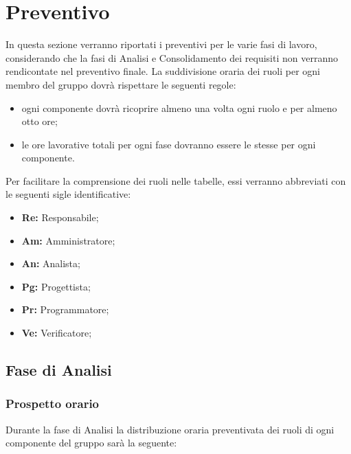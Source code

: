 \section{Preventivo}
	In questa sezione verranno riportati i preventivi per le varie fasi di lavoro, considerando che la fasi di Analisi e Consolidamento dei requisiti non verranno rendicontate nel preventivo finale. 
	La suddivisione oraria dei ruoli per ogni membro del gruppo dovrà rispettare le seguenti regole:
		\begin{itemize}
		\item ogni componente dovrà ricoprire almeno una volta ogni ruolo e per almeno otto ore;
		\item le ore lavorative totali per ogni fase dovranno essere le stesse per ogni componente.
	\end{itemize}
	 Per facilitare la comprensione dei ruoli nelle tabelle, essi verranno abbreviati con le seguenti sigle identificative:
			\begin{itemize}
			\item\textbf{Re:} Responsabile;
			\item\textbf{Am:} Amministratore;
			\item\textbf{An:} Analista;
			\item\textbf{Pg:} Progettista;
			\item\textbf{Pr:} Programmatore;
			\item\textbf{Ve:} Verificatore;
		\end{itemize}
	\subsection{Fase di Analisi}
		\subsubsection{Prospetto orario}
			Durante la fase di Analisi la distribuzione oraria preventivata dei ruoli di ogni componente del gruppo sarà la seguente:
			
